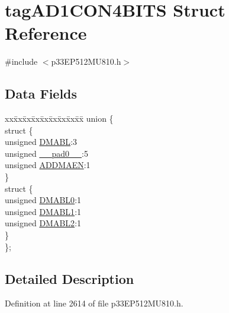 \hypertarget{structtag_a_d1_c_o_n4_b_i_t_s}{}\section{tag\+A\+D1\+C\+O\+N4\+B\+I\+TS Struct Reference}
\label{structtag_a_d1_c_o_n4_b_i_t_s}


{\ttfamily \#include $<$p33\+E\+P512\+M\+U810.\+h$>$}

\subsection*{Data Fields}
\begin{DoxyCompactItemize}
\item 
\begin{tabbing}
xx\=xx\=xx\=xx\=xx\=xx\=xx\=xx\=xx\=\kill
union \{\\
\>struct \{\\
\>\>unsigned \hyperlink{structtag_a_d1_c_o_n4_b_i_t_s_adda9d3ba481141ac9208738397c425fb}{DMABL}:3\\
\>\>unsigned \hyperlink{structtag_a_d1_c_o_n4_b_i_t_s_adf71f3d8410c1f1dbbc96680a92c49af}{\_\_pad0\_\_}:5\\
\>\>unsigned \hyperlink{structtag_a_d1_c_o_n4_b_i_t_s_a44d0e5a2f84a06b3ea34f28e3e7afb78}{ADDMAEN}:1\\
\>\} \\
\>struct \{\\
\>\>unsigned \hyperlink{structtag_a_d1_c_o_n4_b_i_t_s_acda72d244c5eeafabf18f267851b89a1}{DMABL0}:1\\
\>\>unsigned \hyperlink{structtag_a_d1_c_o_n4_b_i_t_s_ae313e43c24c80a35a2ec07db385edf09}{DMABL1}:1\\
\>\>unsigned \hyperlink{structtag_a_d1_c_o_n4_b_i_t_s_ab3ae1ef64c4b8d25608d31a00b64f93d}{DMABL2}:1\\
\>\} \\
\}; \\

\end{tabbing}\end{DoxyCompactItemize}


\subsection{Detailed Description}


Definition at line 2614 of file p33\+E\+P512\+M\+U810.\+h.



